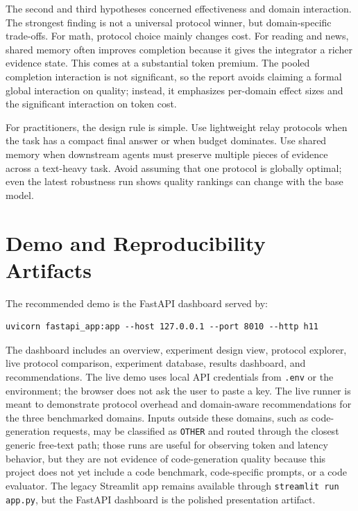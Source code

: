 \documentclass[11pt]{article}
\begin{document}
The second and third hypotheses concerned effectiveness and domain interaction. The strongest finding is not a universal protocol winner, but domain-specific trade-offs. For math, protocol choice mainly changes cost. For reading and news, shared memory often improves completion because it gives the integrator a richer evidence state. This comes at a substantial token premium. The pooled completion interaction is not significant, so the report avoids claiming a formal global interaction on quality; instead, it emphasizes per-domain effect sizes and the significant interaction on token cost.

For practitioners, the design rule is simple. Use lightweight relay protocols when the task has a compact final answer or when budget dominates. Use shared memory when downstream agents must preserve multiple pieces of evidence across a text-heavy task. Avoid assuming that one protocol is globally optimal; even the latest robustness run shows quality rankings can change with the base model.

\section{Demo and Reproducibility Artifacts}

The recommended demo is the FastAPI dashboard served by:

\begin{verbatim}
uvicorn fastapi_app:app --host 127.0.0.1 --port 8010 --http h11
\end{verbatim}

The dashboard includes an overview, experiment design view, protocol explorer, live protocol comparison, experiment database, results dashboard, and recommendations. The live demo uses local API credentials from \texttt{.env} or the environment; the browser does not ask the user to paste a key. The live runner is meant to demonstrate protocol overhead and domain-aware recommendations for the three benchmarked domains. Inputs outside these domains, such as code-generation requests, may be classified as \texttt{OTHER} and routed through the closest generic free-text path; those runs are useful for observing token and latency behavior, but they are not evidence of code-generation quality because this project does not yet include a code benchmark, code-specific prompts, or a code evaluator. The legacy Streamlit app remains available through \texttt{streamlit run app.py}, but the FastAPI dashboard is the polished presentation artifact.
\end{document}
